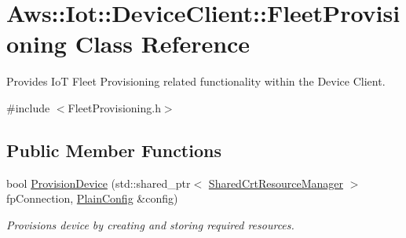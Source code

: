 \hypertarget{class_aws_1_1_iot_1_1_device_client_1_1_fleet_provisioning}{}\section{Aws\+:\+:Iot\+:\+:Device\+Client\+:\+:Fleet\+Provisioning Class Reference}
\label{class_aws_1_1_iot_1_1_device_client_1_1_fleet_provisioning}


Provides IoT Fleet Provisioning related functionality within the Device Client.  




{\ttfamily \#include $<$Fleet\+Provisioning.\+h$>$}

\subsection*{Public Member Functions}
\begin{DoxyCompactItemize}
\item 
bool \hyperlink{class_aws_1_1_iot_1_1_device_client_1_1_fleet_provisioning_a502dc44bd8de73a21d7d42945e9b7f7b}{Provision\+Device} (std\+::shared\+\_\+ptr$<$ \hyperlink{class_aws_1_1_iot_1_1_device_client_1_1_shared_crt_resource_manager}{Shared\+Crt\+Resource\+Manager} $>$ fp\+Connection, \hyperlink{struct_aws_1_1_iot_1_1_device_client_1_1_plain_config}{Plain\+Config} \&config)
\begin{DoxyCompactList}\small\item\em Provisions device by creating and storing required resources. \end{DoxyCompactList}\end{DoxyCompactItemize}

